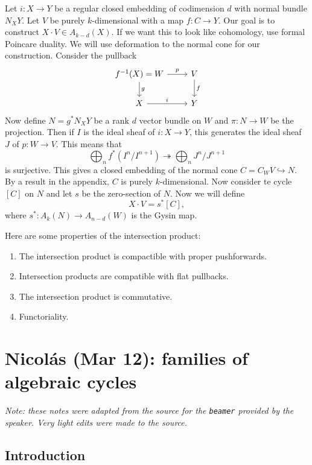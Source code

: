 \documentclass[leqno, openany]{memoir}
\theoremstyle{definition}
\theoremstyle{remark}
\theoremstyle{plain}
\theoremstyle{definition}
\theoremstyle{remark}
\begin{document}
Let $i \colon X \to Y$ be a regular closed embedding of codimension $d$ with normal bundle $N_X Y$. Let $V$ be purely $k$-dimensional with a map $f \colon C \to Y$. Our goal is to construct $X \cdot V \in A_{k-d}(X)$. If we want this to look like cohomology, use formal Poincare duality. We will use deformation to the normal cone for our construction. Consider the pullback 
\begin{equation*}
\begin{tikzcd}
    f^{-1}(X) = W \ar{d}{g} \ar{r}{p} & V \ar{d}{f} \\
    X \ar{r}{i} & Y
\end{tikzcd}
\end{equation*}
Now define $N = g^* N_X Y$ be a rank $d$ vector bundle on $W$ and $\pi \colon N \to W$ be the projection. Then if $I$ is the ideal sheaf of $i \colon X \to Y$, this generates the ideal sheaf $J$ of $p \colon W \to V$. This means that
\[ \bigoplus_n f^* (I^n / I^{n+1}) \twoheadrightarrow \bigoplus_n J^n / J^{n+1} \]
is surjective. This gives a closed embedding of the normal cone $C = C_W V \hookrightarrow N$. By a result in the appendix, $C$ is purely $k$-dimensional. Now consider te cycle $[C]$ on $N$ and let $s$ be the zero-section of $N$. Now we will define 
\[ X \cdot V = s^* [C], \]
where $s^* \colon A_k (N) \to A_{n-d}(W)$ is the Gysin map.

Here are some properties of the intersection product:
\begin{enumerate}
    \item The intersection product is compactible with proper pushforwards.
    \item Intersection products are compatible with flat pullbacks.
    \item The intersection product is commutative.
    \item Functoriality.
\end{enumerate}

\chapter{Nicol\'as (Mar 12): families of algebraic cycles}%
\label{cha:nicolas_mar_12_families_of_algebraic_cycles}

\textit{Note: these notes were adapted from the source for the \texttt{beamer} provided by the speaker. Very light edits were made to the source.} 

\section{Introduction}
\end{document}
